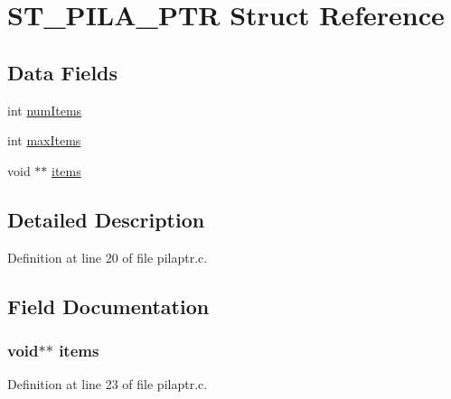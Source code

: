 \hypertarget{struct_s_t___p_i_l_a___p_t_r}{}\section{S\+T\+\_\+\+P\+I\+L\+A\+\_\+\+P\+T\+R Struct Reference}
\label{struct_s_t___p_i_l_a___p_t_r}
\subsection*{Data Fields}
\begin{DoxyCompactItemize}
\item 
int \hyperlink{struct_s_t___p_i_l_a___p_t_r_a1411ea3b26a34297217f0225315d9758}{num\+Items}
\item 
int \hyperlink{struct_s_t___p_i_l_a___p_t_r_ab042caa09e8430028d87252ad6646a52}{max\+Items}
\item 
void $\ast$$\ast$ \hyperlink{struct_s_t___p_i_l_a___p_t_r_a94977134c19c2c536550e6b13d69218d}{items}
\end{DoxyCompactItemize}


\subsection{Detailed Description}


Definition at line 20 of file pilaptr.\+c.



\subsection{Field Documentation}
\hypertarget{struct_s_t___p_i_l_a___p_t_r_a94977134c19c2c536550e6b13d69218d}{}
\subsubsection[{items}]{\setlength{\rightskip}{0pt plus 5cm}void$\ast$$\ast$ items}\label{struct_s_t___p_i_l_a___p_t_r_a94977134c19c2c536550e6b13d69218d}


Definition at line 23 of file pilaptr.\+c.

\hypertarget{struct_s_t___p_i_l_a___p_t_r_ab042caa09e8430028d87252ad6646a52}{}
